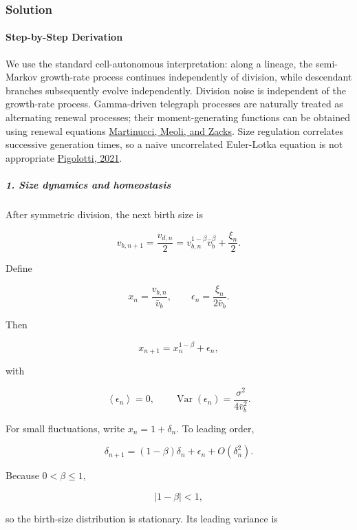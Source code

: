 \subsubsection*{Solution}
\paragraph*{Step-by-Step Derivation}

We use the standard cell-autonomous interpretation: along a lineage, the semi-Markov growth-rate process continues independently of division, while descendant branches subsequently evolve independently. Division noise is independent of the growth-rate process. Gamma-driven telegraph processes are naturally treated as alternating renewal processes; their moment-generating functions can be obtained using renewal equations \href{\detokenize{https://www.cambridge.org/core/services/aop-cambridge-core/content/view/EBD1A21E96B138EDF54FDE0275B7B069/S0001867821000549a.pdf/some_results_on_the_telegraph_process_driven_by_gamma_components.pdf}}{Martinucci, Meoli, and Zacks}. Size regulation correlates successive generation times, so a naive uncorrelated Euler-Lotka equation is not appropriate \href{\detokenize{https://journals.aps.org/pre/abstract/10.1103/PhysRevE.103.L060402}}{Pigolotti, 2021}.

\subparagraph*{1. Size dynamics and homeostasis}

After symmetric division, the next birth size is

\[
v_{b,n+1}=\frac{v_{d,n}}{2} =v_{b,n}^{1-\beta}\bar v_b^\beta+\frac{\xi_n}{2}.
\]

Define

\[
x_n=\frac{v_{b,n}}{\bar v_b}, \qquad \epsilon_n=\frac{\xi_n}{2\bar v_b}.
\]

Then

\[
x_{n+1}=x_n^{1-\beta}+\epsilon_n,
\]

with

\[
\left\langle\epsilon_n\right\rangle=0, \qquad \operatorname{Var}(\epsilon_n)=\frac{\sigma^2}{4\bar v_b^2}.
\]

For small fluctuations, write $x_n=1+\delta_n$. To leading order,

\[
\delta_{n+1}=(1-\beta)\delta_n+\epsilon_n+O(\delta_n^2).
\]

Because $0<\beta\leq1$,

\[
|1-\beta|<1,
\]

so the birth-size distribution is stationary. Its leading variance is

